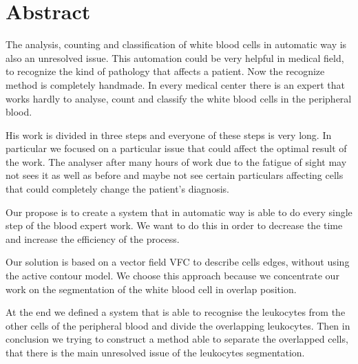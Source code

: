 \chapter*{Abstract}

The analysis, counting and classification of white blood cells in automatic way is also an unresolved issue. This automation could be very helpful in medical field, to recognize the kind of pathology that affects a patient. Now the recognize method is completely handmade. In every medical center there is an expert that works hardly to analyse, count and classify the white blood cells in the peripheral blood.

\bigskip

His work is divided in three steps and everyone of these steps is very long. In particular we focused on a particular issue that could affect the optimal result of the work. The analyser after many hours of work due to the fatigue of sight may not sees it as well as before and maybe not see certain particulars affecting cells that could completely change the patient's diagnosis.

\bigskip

Our propose is to create a system that in automatic way is able to do every single step of the blood expert work. We want to do this in order to decrease the time and increase the efficiency of the process.

\bigskip

Our solution is based on a vector field VFC to describe cells edges, without using the active contour model. We choose this approach because we concentrate our work on the segmentation of the white blood cell in overlap position.

\bigskip

At the end we defined a system that is able to recognise the leukocytes from the other cells of the peripheral blood and divide the overlapping leukocytes. Then in conclusion we trying to construct a method able to separate the overlapped cells, that there is the main unresolved issue of the leukocytes segmentation.


